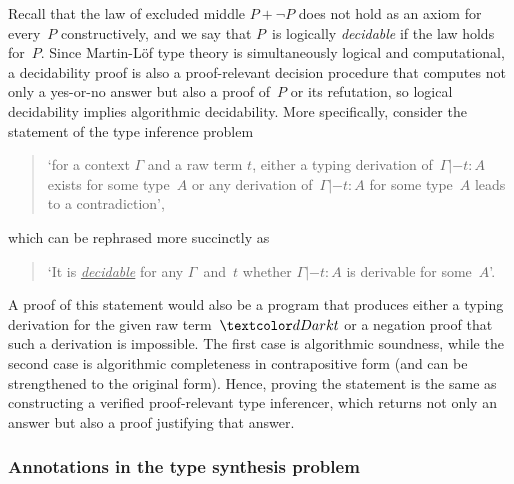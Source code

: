 Recall that the law of excluded middle $P + \neg P$ does not hold as an axiom for every~$P$ constructively, and we say that $P$~is logically \emph{decidable} if the law holds for~$P$.
Since Martin-L\"of type theory is simultaneously logical and computational, a decidability proof is also a proof-relevant decision procedure that computes not only a yes-or-no answer but also a proof of~$P$ or its refutation, so logical decidability implies algorithmic decidability.
More specifically, consider the statement of the type inference problem
\begin{quote}
  `for a context $\Gamma$ and a raw term $t$, either a typing derivation of\, $\Gamma |- t : A$ exists for some type~$A$ or any derivation of\, $\Gamma |- t : A$ for some type~$A$ leads to a contradiction',
\end{quote}
which can be rephrased more succinctly as
\begin{quote}
  `It is \underline{\emph{decidable}} for any $\Gamma$~and~$t$ whether $\Gamma |- t : A$ is derivable for some~$A$'.
\end{quote}
A proof of this statement would also be a program that produces either a typing derivation for the given raw term~$\isTerm{t}$ or a negation proof that such a derivation is impossible.
The first case is algorithmic soundness, while the second case is algorithmic completeness in contrapositive form (and can be strengthened to the original form).
Hence, proving the statement is the same as constructing a verified proof-relevant type inferencer, which returns not only an answer but also a proof justifying that answer.


\subsubsection{Annotations in the type synthesis problem}

